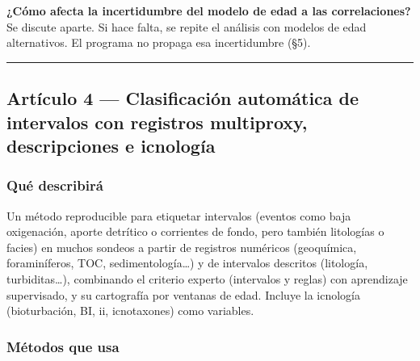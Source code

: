 \documentclass[
  10pt,
]{article}
\begin{document}
\textbf{¿Cómo afecta la incertidumbre del modelo de edad a las
correlaciones?} Se discute aparte. Si hace falta, se repite el análisis
con modelos de edad alternativos. El programa no propaga esa
incertidumbre (§5).

\begin{center}\rule{0.5\linewidth}{0.5pt}\end{center}

\hypertarget{artuxedculo-4-clasificaciuxf3n-automuxe1tica-de-intervalos-con-registros-multiproxy-descripciones-e-icnologuxeda}{%
\subsection{Artículo 4 --- Clasificación automática de intervalos con
registros multiproxy, descripciones e
icnología}\label{artuxedculo-4-clasificaciuxf3n-automuxe1tica-de-intervalos-con-registros-multiproxy-descripciones-e-icnologuxeda}}

\hypertarget{quuxe9-describiruxe1-2}{%
\subsubsection{Qué describirá}\label{quuxe9-describiruxe1-2}}

Un método reproducible para etiquetar intervalos (eventos como baja
oxigenación, aporte detrítico o corrientes de fondo, pero también
litologías o facies) en muchos sondeos a partir de registros numéricos
(geoquímica, foraminíferos, TOC, sedimentología\ldots) y de intervalos
descritos (litología, turbiditas\ldots), combinando el criterio experto
(intervalos y reglas) con aprendizaje supervisado, y su cartografía por
ventanas de edad. Incluye la icnología (bioturbación, BI, ii,
icnotaxones) como variables.

\hypertarget{muxe9todos-que-usa-3}{%
\subsubsection{Métodos que usa}\label{muxe9todos-que-usa-3}}
\end{document}
